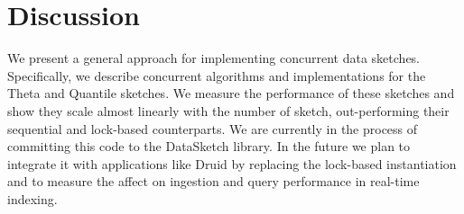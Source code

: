 \section{Discussion}
\label{sec:discussion}

We present a general approach for implementing concurrent data sketches. Specifically, we describe concurrent algorithms and implementations for the Theta and Quantile sketches. We measure the performance of these sketches and show they scale almost linearly with the number of sketch, out-performing their sequential and lock-based counterparts. We are currently in the process of committing this code to the DataSketch library. In the future we plan to integrate it with applications like Druid by replacing the lock-based instantiation  and to measure the affect on ingestion and query performance in real-time indexing.
